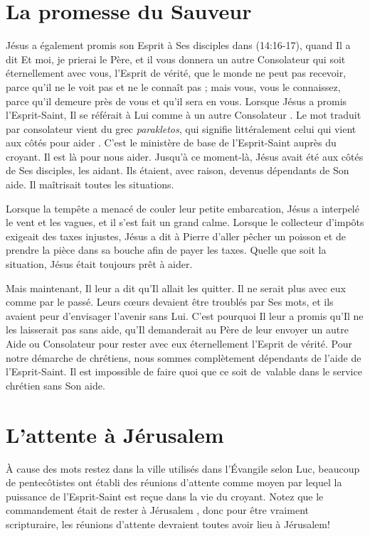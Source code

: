 \section{La promesse du Sauveur}

Jésus a également promis son Esprit à Ses disciples dans
 \BRallowhypbch{}(14:16-17)\BRforbidhypbch, quand Il a dit\frcolon{}
 \Og Et moi, je prierai le Père, et il vous donnera un autre Consolateur
 qui soit éternellement avec vous, l'Esprit de vérité, que le monde ne peut
 pas recevoir, parce qu'il ne le voit pas et ne le connaît pas ; mais vous,
 vous le connaissez, parce qu'il demeure près de vous
 et qu'il sera en vous. \Fg{}
 Lorsque Jésus a promis l'Esprit-Saint, Il se référait à Lui comme à
 \Og un autre Consolateur \Fg{}.
 Le mot traduit par \Og consolateur \Fg{} vient du grec \emph{parakletos},
 qui signifie littéralement \Og celui qui vient aux côtés pour aider \Fg{}.
 C'est le ministère de base de l'Esprit-Saint auprès du croyant.
 Il est là pour nous aider. Jusqu'à ce moment-là, Jésus avait été aux côtés
 de Ses disciples, les aidant. Ils étaient, avec raison, devenus dépendants
 de Son aide. Il maîtrisait toutes les situations.

Lorsque la tempête a menacé de couler leur petite embarcation, Jésus
 a interpelé le vent et les vagues, et il s'est fait un grand calme.
 Lorsque le collecteur d'impôts exigeait des taxes injustes,
 Jésus a dit à Pierre d'aller pêcher un poisson et de prendre
 la pièce dans sa bouche afin de payer les taxes.
 Quelle que soit la situation, Jésus était toujours prêt à aider.

Mais maintenant, Il leur a dit qu'Il allait les quitter.
 Il ne serait plus avec eux comme par le passé.
 Leurs cœurs devaient être troublés par Ses mots,
 et ils avaient peur d'envisager l'avenir sans Lui.
 C'est pourquoi Il leur a promis qu'Il ne les laisserait pas sans aide,
 qu'Il demanderait au Père de leur envoyer un autre Aide ou Consolateur
 pour rester avec eux éternellement\frcolon{}
 l'Esprit de vérité.
 Pour notre démarche de chrétiens, nous sommes complètement dépendants de
 l'aide de l'Esprit-Saint.
 Il est impossible de faire quoi que ce soit de~valable dans le service
 chrétien sans Son aide.

\section{L'attente \`a J\'erusalem}

À cause des mots \Og restez dans la ville \Fg{} utilisés dans
 l'Évangile
 selon Luc, beaucoup de pentecôtistes ont établi des \Og réunions
 d'attente \Fg{} comme moyen par lequel la puissance de l'Esprit-Saint est
 reçue dans la vie du croyant. Notez que le commandement était de \Og rester
 à Jérusalem \Fg{},
 donc pour être vraiment scripturaire, les réunions d'attente devraient toutes
 avoir lieu à Jérusalem!

